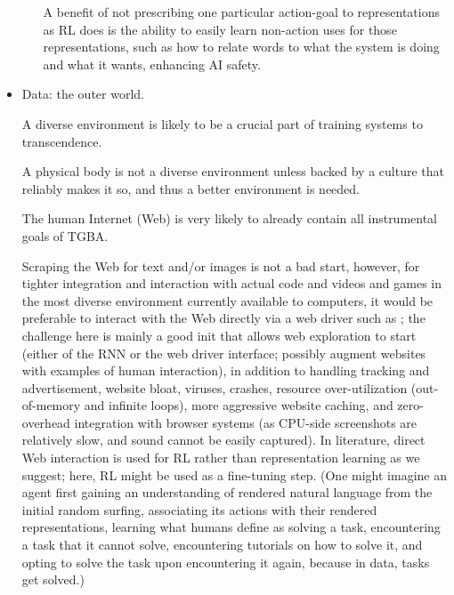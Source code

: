 \documentclass{article}
\begin{document}
\begin{itemize}
\begin{itemize}
A benefit of not prescribing one particular action-goal to representations as RL does is the ability to easily learn non-action uses for those representations, such as how to relate words to what the system is doing and what it wants, enhancing AI safety.
\end{itemize}
\item Data: the outer world.

A diverse environment is likely to be a crucial part of training systems to transcendence.

A physical body is not a diverse environment unless backed by a culture that reliably makes it so, and thus a better environment is needed.

The human Internet (Web) is very likely to already contain all instrumental goals of TGBA.

Scraping the Web for text \cite{NEURIPS2020_1457c0d6} and/or images \cite{radford2021learning} is not a bad start, however, for tighter integration and interaction with actual code and videos and games in the most diverse environment currently available to computers, it would be preferable to interact with the Web directly via a web driver such as \cite{8117878}; the challenge here is mainly a good init that allows web exploration to start (either of the RNN or the web driver interface; possibly augment websites with examples of human interaction), in addition to handling tracking and advertisement, website bloat, viruses, crashes, resource over-utilization (out-of-memory and infinite loops), more aggressive website caching, and zero-overhead integration with browser systems (as CPU-side screenshots are relatively slow, and sound cannot be easily captured). In literature, direct Web interaction is used for RL \cite{pmlr-v70-shi17a} \cite{ToyamaEtAl2021AndroidEnv} rather than representation learning as we suggest; here, RL might be used as a fine-tuning step. (One might imagine an agent first gaining an understanding of rendered natural language from the initial random surfing, associating its actions with their rendered representations, learning what humans define as solving a task, encountering a task that it cannot solve, encountering tutorials on how to solve it, and opting to solve the task upon encountering it again, because in data, tasks get solved.)


\end{itemize}
\end{document}
